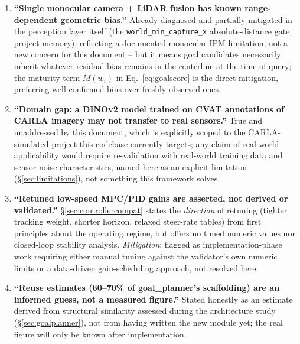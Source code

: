 \documentclass[11pt]{article}
\newcommand{\code}[1]{\texttt{#1}}
\newcommand{\pkg}[1]{\texttt{#1}}
\begin{document}
\begin{enumerate}[leftmargin=1.8em]
  \pkg{behavior\_velocity\_planner}/\pkg{path\_safety\_checker}'s object-aware collision checks
  before reaching control (\S\ref{sec:control}) -- but the \emph{goal-selection} stage itself
  (Eq.~\ref{eq:goalscore}) does not yet reason about occupancy at the candidate pose; adding an
  occupancy/object check at candidate-scoring time (not just at final-path-safety time) is named as
  an immediate hardening item even within the classical phase, ahead of full Phase~2 work.
  \item \textbf{``Single monocular camera + LiDAR fusion has known range-dependent geometric
  bias.''} Already diagnosed and partially mitigated in the perception layer itself (the
  \code{world\_min\_capture\_x} absolute-distance gate, project memory), reflecting a documented
  monocular-IPM limitation, not a new concern for this document -- but it means goal candidates
  necessarily inherit whatever residual bias remains in the centerline at the time of query; the
  maturity term $M(w_i)$ in Eq.~\ref{eq:goalscore} is the direct mitigation, preferring
  well-confirmed bins over freshly observed ones.
  \item \textbf{``Domain gap: a DINOv2 model trained on CVAT annotations of CARLA imagery may not
  transfer to real sensors.''} True and unaddressed by this document, which is explicitly scoped
  to the CARLA-simulated project this codebase currently targets; any claim of real-world
  applicability would require re-validation with real-world training data and sensor noise
  characteristics, named here as an explicit limitation (\S\ref{sec:limitations}), not something
  this framework solves.
  \item \textbf{``Retuned low-speed MPC/PID gains are asserted, not derived or validated.''}
  \S\ref{sec:controllercompat} states the \emph{direction} of retuning (tighter tracking weight,
  shorter horizon, relaxed steer-rate tables) from first principles about the operating regime, but
  offers no tuned numeric values nor closed-loop stability analysis. \emph{Mitigation}: flagged as
  implementation-phase work requiring either manual tuning against the validator's own numeric
  limits or a data-driven gain-scheduling approach, not resolved here.
  \item \textbf{``Reuse estimates (60--70\% of goal\_planner's scaffolding) are an informed
  guess, not a measured figure.''} Stated honestly as an estimate derived from structural
  similarity assessed during the architecture study (\S\ref{sec:goalplanner}), not from having
  written the new module yet; the real figure will only be known after implementation.
\end{enumerate}
\end{document}
